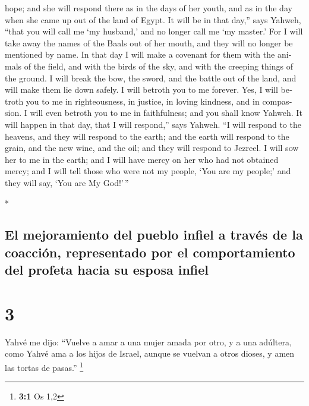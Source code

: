 \begin{paracol}{2}
\begin{otherlanguage}{english}
hope; and she will respond there as in the days of her youth, and as in
the day when she came up out of the land of Egypt.  It
will be in that day,'' says Yahweh, ``that you will call me `my
husband,' and no longer call me `my master.'  For I will
take away the names of the Baals out of her mouth, and they will no
longer be mentioned by name.  In that day I will make a
covenant for them with the animals of the field, and with the birds of
the sky, and with the creeping things of the ground. I will break the
bow, the sword, and the battle out of the land, and will make them lie
down safely.  I will betroth you to me forever. Yes, I
will betroth you to me in righteousness, in justice, in loving kindness,
and in compassion.  I will even betroth you to me in
faithfulness; and you shall know Yahweh.  It will happen
in that day, that I will respond,'' says Yahweh. ``I will respond to the
heavens, and they will respond to the earth;  and the
earth will respond to the grain, and the new wine, and the oil; and they
will respond to Jezreel.  I will sow her to me in the
earth; and I will have mercy on her who had not obtained mercy; and I
will tell those who were not my people, `You are my people;' and they
will say, `You are My God!'\,''

\end{otherlanguage}

\switchcolumn[0]*

\hypertarget{el-mejoramiento-del-pueblo-infiel-a-travuxe9s-de-la-coacciuxf3n-representado-por-el-comportamiento-del-profeta-hacia-su-esposa-infiel}{%
\subsection{El mejoramiento del pueblo infiel a través de la coacción,
representado por el comportamiento del profeta hacia su esposa
infiel}\label{el-mejoramiento-del-pueblo-infiel-a-travuxe9s-de-la-coacciuxf3n-representado-por-el-comportamiento-del-profeta-hacia-su-esposa-infiel}}

\hypertarget{section-4}{%
\section{3}\label{section-4}}

 Yahvé me dijo: ``Vuelve a amar a una mujer amada por
otro, y a una adúltera, como Yahvé ama a los hijos de Israel, aunque se
vuelvan a otros dioses, y amen las tortas de pasas.'' \footnote{\textbf{3:1}
  Os 1,2}


\end{paracol}
